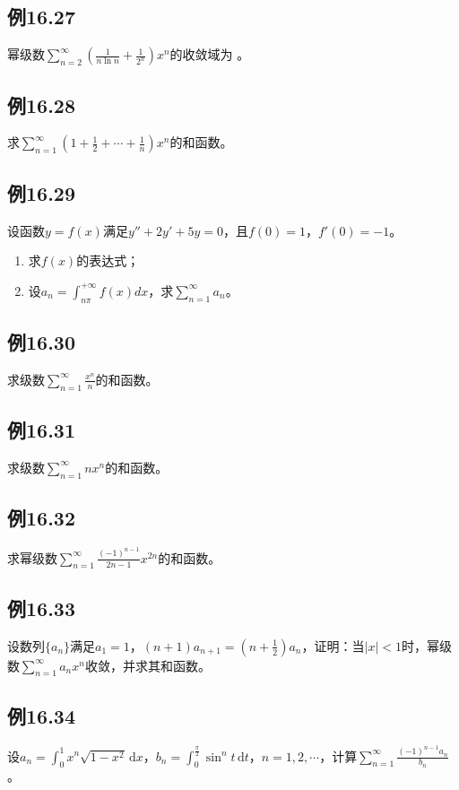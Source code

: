 \documentclass[UTF8]{ctexart}
\theoremstyle{remark}
\begin{document}
\begin{multicols}{2}
	\subsection*{例16.27}
	幂级数\(\sum_{n = 2}^{\infty}\left(\frac{1}{n\ln n}+\frac{1}{2^{n}}\right)x^{n}\)的收敛域为  。
	
	\subsection*{例16.28}
	求\(\sum_{n = 1}^{\infty}\left(1+\frac{1}{2}+\cdots+\frac{1}{n}\right)x^{n}\)的和函数。
	
	\subsection*{例16.29}
	设函数\(y = f(x)\)满足\(y'' + 2y' + 5y = 0\)，且\(f(0)=1\)，\(f'(0)= - 1\)。
	\begin{enumerate}
		\item 求\(f(x)\)的表达式；
		\item 设\(a_{n}=\int_{n\pi}^{+\infty}f(x)dx\)，求\(\sum_{n = 1}^{\infty}a_{n}\)。
	\end{enumerate}
	
	\subsection*{例16.30}
	求级数\(\sum_{n = 1}^{\infty}\frac{x^{n}}{n}\)的和函数。
	
	
	
	\subsection*{例16.31}
	求级数\(\sum_{n = 1}^{\infty}nx^{n}\)的和函数。
	
	\subsection*{例16.32}
	求幂级数\(\sum_{n = 1}^{\infty}\frac{(-1)^{n - 1}}{2n - 1}x^{2n}\)的和函数。
	
	\subsection*{例16.33}
	设数列\(\{a_n\}\)满足\(a_1 = 1\)，\((n + 1)a_{n + 1}=\left(n + \frac{1}{2}\right)a_n\)，证明：当\(\vert x\vert < 1\)时，幂级数\(\sum_{n = 1}^{\infty}a_nx^n\)收敛，并求其和函数。
	
	\subsection*{例16.34}
	设\(a_n = \int_{0}^{1}x^n\sqrt{1 - x^2}\,\mathrm{d}x\)，\(b_n = \int_{0}^{\frac{\pi}{2}}\sin^n t\,\mathrm{d}t\)，\(n = 1, 2, \cdots\)，计算\(\sum_{n = 1}^{\infty}\frac{(-1)^{n - 1}a_n}{b_n}\)。
	

\end{multicols}
\end{document}
